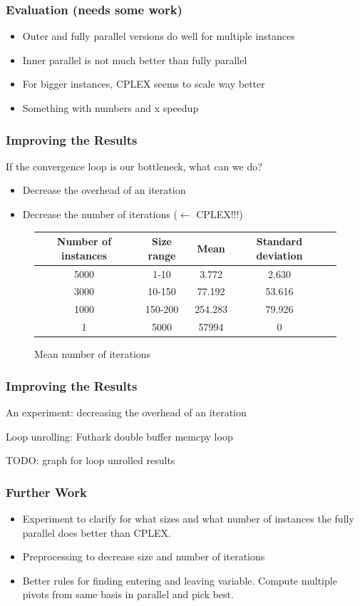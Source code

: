 \documentclass[handout]{beamer}
\begin{document}
\begin{frame}
\frametitle{Evaluation (needs some work)}
\begin{itemize}
\item Outer and fully parallel versions do well for multiple instances
\item Inner parallel is not much better than fully parallel
\item For bigger instances, CPLEX seems to scale way better
\item Something with numbers and x speedup
\end{itemize}
\end{frame}

\begin{frame}
\frametitle{Improving the Results}

If the convergence loop is our bottleneck, what can we do?

\begin{itemize}
\item Decrease the overhead of an iteration
\item Decrease the number of iterations ($\leftarrow$ CPLEX!!!)
\end{itemize}

\begin{figure}
\begin{tabular}{|c|c|c|c|c|}
\hline
\textbf{Number of instances} & \textbf{Size range} & \textbf{Mean} & \textbf{Standard deviation} \\\hline
5000 & 1-10 & 3.772 & 2.630 \\\hline
3000 & 10-150 & 77.192 & 53.616 \\\hline
1000 & 150-200 & 254.283 & 79.926 \\\hline
1 & 5000 & 57994 & 0 \\\hline
\end{tabular}
\caption{Mean number of iterations}
\end{figure}
\end{frame}

\begin{frame}
\frametitle{Improving the Results}
An experiment: decreasing the overhead of an iteration

Loop unrolling: Futhark double buffer memcpy loop

TODO: graph for loop unrolled results
\end{frame}


\begin{frame}
\frametitle{Further Work}
\begin{itemize}
	\item Experiment to clarify for what sizes and what number of instances the fully parallel does better than CPLEX.
	\item Preprocessing to decrease size and number of iterations
	\item Better rules for finding entering and leaving variable. Compute multiple pivots from same basis in parallel and pick best.
\end{itemize}
\end{frame}
\end{document}
